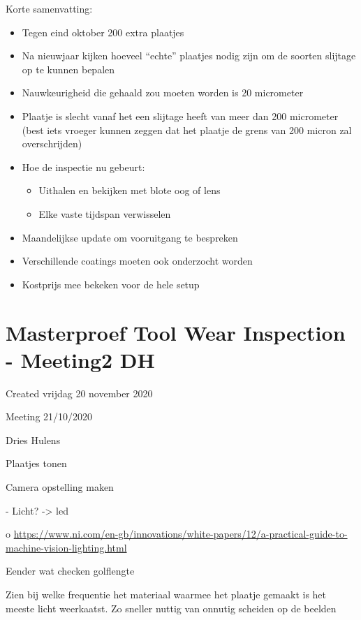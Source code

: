 \documentclass{article}
\begin{document}
Korte samenvatting:

\begin{itemize}
\item Tegen eind oktober 200 extra plaatjes
\item Na nieuwjaar kijken hoeveel “echte” plaatjes nodig zijn om de soorten slijtage op te kunnen bepalen
\item Nauwkeurigheid die gehaald zou moeten worden is 20 micrometer
\item Plaatje is slecht vanaf het een slijtage heeft van meer dan 200 micrometer (best iets vroeger kunnen zeggen dat het plaatje de grens van 200 micron zal overschrijden)
\item Hoe de inspectie nu gebeurt:
	\begin{itemize}
	\item Uithalen en bekijken met blote oog of lens
	\item Elke vaste tijdspan verwisselen
	\end{itemize}
\item Maandelijkse update om vooruitgang te bespreken
\item Verschillende coatings moeten ook onderzocht worden
\item Kostprijs mee bekeken voor de hele setup
\end{itemize}

		\section{Masterproef Tool Wear Inspection - Meeting2 DH}

Created vrijdag 20 november 2020



Meeting 21/10/2020

Dries Hulens



Plaatjes tonen



Camera opstelling maken 

-	Licht? -\textgreater{} led

o	\href{https://www.ni.com/en-gb/innovations/white-papers/12/a-practical-guide-to-machine-vision-lighting.html}{https://www.ni.com/en-gb/innovations/white-papers/12/a-practical-guide-to-machine-vision-lighting.html}

Eender wat checken golflengte 

Zien bij welke frequentie het materiaal waarmee het plaatje gemaakt is het meeste licht weerkaatst.  Zo sneller nuttig van onnutig scheiden op de beelden
\end{document}
